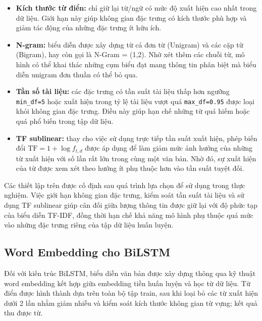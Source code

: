 \begin{itemize}[leftmargin=2em]

  \item \textbf{Kích thước từ điển:} chỉ giữ lại \tfidfmaxfeatures{} từ/ngữ có mức độ xuất hiện cao nhất trong dữ liệu. Giới hạn này giúp không gian đặc trưng có kích thước phù hợp và giảm tác động của những đặc trưng ít hữu ích.

  \item \textbf{N-gram:} biểu diễn được xây dựng từ cả đơn từ (Unigram) và các cặp từ (Bigram), hay còn gọi là N-Gram = (1,2). Nhờ xét thêm các chuỗi từ, mô hình có thể khai thác những cụm biểu đạt mang thông tin phân biệt mà biểu diễn unigram đơn thuần có thể bỏ qua.

  \item \textbf{Tần số tài liệu:} các đặc trưng có tần suất tài liệu thấp hơn ngưỡng \texttt{min\_df=5} hoặc xuất hiện trong tỷ lệ tài liệu vượt quá \texttt{max\_df=0.95} được loại khỏi không gian đặc trưng. Điều này giúp hạn chế những từ quá hiếm hoặc quá phổ biến trong tập dữ liệu.

  \item \textbf{TF sublinear:} thay cho việc sử dụng trực tiếp tần suất xuất hiện, phép biến đổi $\mathrm{TF} = 1 + \log f_{t,d}$ được áp dụng để làm giảm mức ảnh hưởng của những từ xuất hiện với số lần rất lớn trong cùng một văn bản. Nhờ đó, sự xuất hiện của từ được xem xét theo hướng ít phụ thuộc hơn vào tần suất tuyệt đối.

\end{itemize}

Các thiết lập trên được cố định sau quá trình lựa chọn để sử dụng trong thực nghiệm. Việc giới hạn không gian đặc trưng, kiểm soát tần suất tài liệu và sử dụng TF sublinear giúp cân đối giữa lượng thông tin được giữ lại với độ phức tạp của biểu diễn TF-IDF, đồng thời hạn chế khả năng mô hình phụ thuộc quá mức vào những đặc trưng riêng của tập dữ liệu huấn luyện.

\subsection{Word Embedding cho BiLSTM}

Đối với kiến trúc BiLSTM, biểu diễn văn bản được xây dựng thông qua kỹ thuật word embedding kết hợp giữa embedding tiền huấn luyện và học từ dữ liệu. Từ điển được hình thành dựa trên toàn bộ tập train, sau khi loại bỏ các từ xuất hiện dưới 2 lần nhằm giảm nhiễu và kiểm soát kích thước không gian từ vựng; kết quả thu được \bilstmvocab{} từ.

